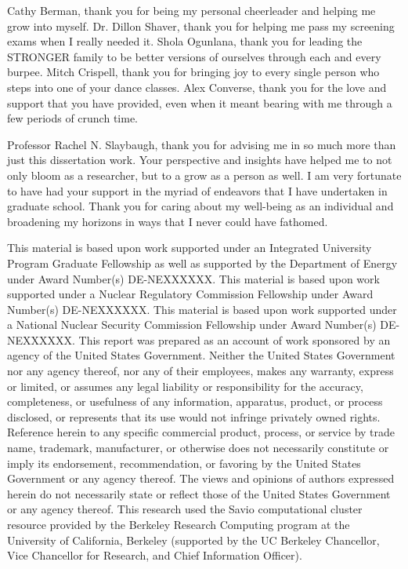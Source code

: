 \documentclass{ucbthesis}
\begin{document}
\begin{frontmatter}
\begin{acknowledgements}
Cathy Berman, thank you for being my personal cheerleader and helping me
grow into myself. Dr. Dillon Shaver, thank you for helping me pass my
screening exams when I really needed it.
Shola Ogunlana, thank you for leading the STRONGER family
to be better versions of ourselves through each and every burpee. Mitch
Crispell, thank you for bringing joy to every single person who steps into
one of your dance classes. Alex Converse, thank you for the love and support
that you have provided, even when it meant bearing with me through a few
periods of crunch time.

Professor Rachel N. Slaybaugh, thank you for advising me in so much more
than just this dissertation work. Your perspective and insights have helped
me to not only bloom as a researcher, but to a grow as a person as well. I
am very fortunate to have had your support in the myriad of endeavors that
I have undertaken in graduate school. Thank you for caring about my well-being
as an individual and broadening my horizons in ways that I never could have
fathomed.

\vspace{\fill}

\scriptsize{This material is based upon work supported under an Integrated
University Program Graduate Fellowship as well as supported by the Department 
of Energy under Award Number(s) DE-NEXXXXXX. 
This material is based upon work supported under a Nuclear Regulatory 
Commission Fellowship under Award Number(s) DE-NEXXXXXX. 
This material is based upon work supported under a National Nuclear Security 
Commission Fellowship under Award Number(s) DE-NEXXXXXX. 
This report was prepared as an account  of work sponsored by an agency of the 
United States Government. Neither the United 
States Government nor any agency thereof, nor any of their employees, makes any 
warranty, express or limited, or assumes any legal liability or responsibility for the 
accuracy, completeness, or usefulness of any information, apparatus, product, or
process disclosed, or represents that its use would not infringe privately owned
rights. Reference herein to any specific commercial product, process, or service by
trade name, trademark, manufacturer, or otherwise does not necessarily constitute or
imply its endorsement, recommendation, or favoring by the United States Government or
any agency thereof. The views and opinions of authors expressed herein do not 
necessarily state or reflect those of the United States Government or any agency 
thereof. This research used the Savio computational cluster resource provided by the 
Berkeley Research Computing program at the University of California, Berkeley 
(supported by the UC Berkeley Chancellor, Vice Chancellor for Research, and Chief 
Information Officer).}

\end{acknowledgements}

\end{frontmatter}
\end{document}
